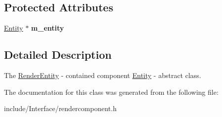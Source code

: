 \subsection*{Protected Attributes}
\begin{DoxyCompactItemize}
\item 
\hypertarget{classEngine_1_1RenderEntity_a42cd72f5efd42958dac5138d046a2d8d}{}\hyperlink{classEngine_1_1Entity}{Entity} $\ast$ {\bfseries m\+\_\+entity}\label{classEngine_1_1RenderEntity_a42cd72f5efd42958dac5138d046a2d8d}

\end{DoxyCompactItemize}


\subsection{Detailed Description}
The \hyperlink{classEngine_1_1RenderEntity}{Render\+Entity} -\/ contained component \hyperlink{classEngine_1_1Entity}{Entity} -\/ abstract class. 

The documentation for this class was generated from the following file\+:\begin{DoxyCompactItemize}
\item 
include/\+Interface/rendercomponent.\+h\end{DoxyCompactItemize}
